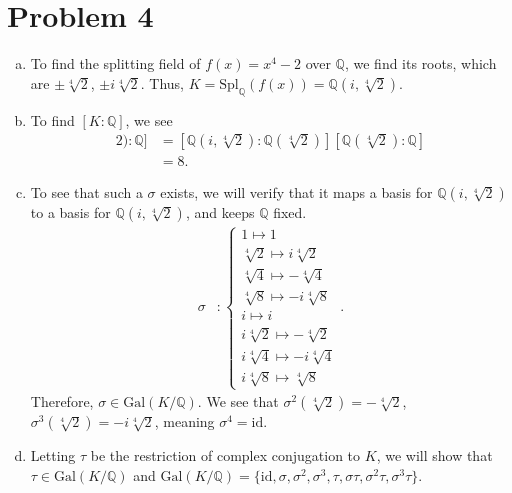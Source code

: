 \documentclass[10pt]{extarticle}
\newcommand{\Q}{\mathbb{Q}}
\begin{document}
  \section{Problem 4}%
  \begin{enumerate}[(a)]
    \item To find the splitting field of $f(x) = x^4 - 2$ over $\Q$, we find its roots, which are $\pm \sqrt[4]{2}$, $\pm i\sqrt[4]{2}$. Thus, $ K = \text{Spl}_{\Q}(f(x)) = \Q(i,\sqrt[4]{2})$.
    \item To find $[K:\Q]$, we see
      \begin{align*}
        [\Q(i,\sqrt[4]{2}) : \Q] &= [\Q(i,\sqrt[4]{2}):\Q(\sqrt[4]{2})][\Q(\sqrt[4]{2}):\Q]\\
                                 &= 8.
      \end{align*}
    \item To see that such a $\sigma$ exists, we will verify that it maps a basis for $\Q(i,\sqrt[4]{2})$ to a basis for $\Q(i,\sqrt[4]{2})$, and keeps $\Q$ fixed.
      \begin{align*}
        \sigma &: \begin{cases}
                    1 \mapsto 1\\
                    \sqrt[4]{2} \mapsto i\sqrt[4]{2}\\
                    \sqrt[4]{4} \mapsto -\sqrt[4]{4}\\
                    \sqrt[4]{8} \mapsto -i\sqrt[4]{8}\\
                    i \mapsto i\\
                    i\sqrt[4]{2} \mapsto -\sqrt[4]{2}\\
                    i\sqrt[4]{4} \mapsto -i\sqrt[4]{4}\\
                    i\sqrt[4]{8} \mapsto \sqrt[4]{8}
                  \end{cases}.
      \end{align*}
      Therefore, $\sigma \in \text{Gal}(K/\Q)$. We see that $\sigma^{2}(\sqrt[4]{2}) = -\sqrt[4]{2}$, $\sigma^3(\sqrt[4]{2}) = -i\sqrt[4]{2}$, meaning $\sigma^{4} = \text{id}$.
    \item Letting $\tau$ be the restriction of complex conjugation to $K$, we will show that $\tau\in \text{Gal}(K/\Q)$ and $\text{Gal}(K/\Q) = \{\text{id},\sigma,\sigma^2,\sigma^3,\tau,\sigma\tau,\sigma^2\tau,\sigma^3\tau\}$.\\


\end{enumerate}
\end{document}
